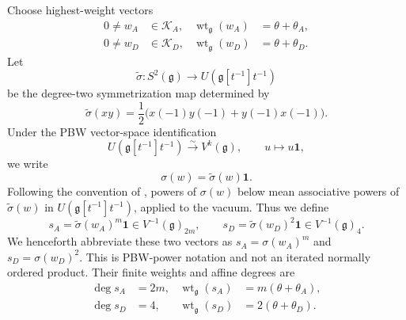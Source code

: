 \documentclass[11pt,reqno]{amsart}
\theoremstyle{definition}
\theoremstyle{remark}
\begin{document}
Choose highest-weight vectors
\begin{equation*}
\begin{aligned}
  0\ne w_A&\in\mathcal K_A,
  &
  \operatorname{wt}_{\mathfrak g}(w_A)
  &=\theta+\theta_A,\\
  0\ne w_D&\in\mathcal K_D,
  &
  \operatorname{wt}_{\mathfrak g}(w_D)
  &=\theta+\theta_D.
\end{aligned}
\end{equation*}
Let
\begin{equation*}
  \widetilde\sigma:S^2(\mathfrak g)
  \longrightarrow
  U\!\left(\mathfrak g[t^{-1}]t^{-1}\right)
\end{equation*}
be the degree-two symmetrization map determined by
\begin{equation*}
  \widetilde\sigma(xy)
  =
  \frac12
  \bigl(
    x(-1)y(-1)+y(-1)x(-1)
  \bigr).
\end{equation*}
Under the PBW vector-space identification
\begin{equation}
  U\!\left(\mathfrak g[t^{-1}]t^{-1}\right)
  \overset{\sim}{\longrightarrow}
  V^k(\mathfrak g),
  \qquad
  u\longmapsto u\mathbf1,
  \label{dl:eq:Dl-affine-PBW-identification}
\end{equation}
we write
\begin{equation*}
  \sigma(w)=\widetilde\sigma(w)\mathbf1.
\end{equation*}
Following the convention of \cite{ArakawaMoreau2018}, powers of
\(\sigma(w)\) below mean associative powers of
\(\widetilde\sigma(w)\) in
\(U(\mathfrak g[t^{-1}]t^{-1})\), applied to the vacuum.  Thus we
define
\begin{equation*}
  s_A
  =
  \widetilde\sigma(w_A)^m\mathbf1
  \in V^{-1}(\mathfrak g)_{2m},
  \qquad
  s_D
  =
  \widetilde\sigma(w_D)^2\mathbf1
  \in V^{-1}(\mathfrak g)_4.
\end{equation*}
We henceforth abbreviate these two vectors as
\(s_A=\sigma(w_A)^m\) and \(s_D=\sigma(w_D)^2\).  This is PBW-power
notation and not an iterated normally ordered product.  Their finite
weights and affine degrees are
\begin{equation*}
\begin{aligned}
  \deg s_A&=2m,
  &
  \operatorname{wt}_{\mathfrak g}(s_A)
  &=m(\theta+\theta_A),\\
  \deg s_D&=4,
  &
  \operatorname{wt}_{\mathfrak g}(s_D)
  &=2(\theta+\theta_D).
\end{aligned}
\end{equation*}
\end{document}
